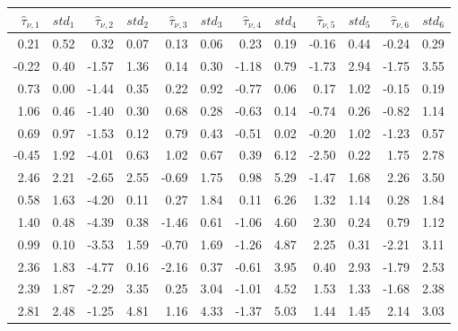 \documentclass{article}
\begin{document}
\begin{tabular}{rrrrrrrrrrrr}\hline 
	$\widehat{\tau}_{\nu,1}$ & $std_1$ & $\widehat{\tau}_{\nu,2}$ & $std_2$ & $\widehat{\tau}_{\nu,3}$ & $std_3$ & $\widehat{\tau}_{\nu,4}$ & $std_4$ &  $\widehat{\tau}_{\nu,5}$ & $std_5$ & $\widehat{\tau}_{\nu,6}$ & $std_6$ \\ \hline 
	0.21 &     0.52 &     0.32 &     0.07  &     0.13 &     0.06 &     0.23 &     0.19 &    -0.16 &     0.44  &    -0.24 &     0.29  \\ 
	-0.22 &     0.40 &    -1.57 &     1.36  &     0.14 &     0.30 &    -1.18 &     0.79 &    -1.73 &     2.94  &    -1.75 &     3.55  \\ 
	0.73 &     0.00 &    -1.44 &     0.35  &     0.22 &     0.92 &    -0.77 &     0.06 &     0.17 &     1.02  &    -0.15 &     0.19  \\ 
	1.06 &     0.46 &    -1.40 &     0.30  &     0.68 &     0.28 &    -0.63 &     0.14 &    -0.74 &     0.26  &    -0.82 &     1.14  \\ 
	0.69 &     0.97 &    -1.53 &     0.12  &     0.79 &     0.43 &    -0.51 &     0.02 &    -0.20 &     1.02  &    -1.23 &     0.57  \\ 
	-0.45 &     1.92 &    -4.01 &     0.63  &     1.02 &     0.67 &     0.39 &     6.12 &    -2.50 &     0.22  &     1.75 &     2.78  \\ 
	2.46 &     2.21 &    -2.65 &     2.55  &    -0.69 &     1.75 &     0.98 &     5.29 &    -1.47 &     1.68  &     2.26 &     3.50  \\ 
	0.58 &     1.63 &    -4.20 &     0.11  &     0.27 &     1.84 &     0.11 &     6.26 &     1.32 &     1.14  &     0.28 &     1.84  \\ 
	1.40 &     0.48 &    -4.39 &     0.38  &    -1.46 &     0.61 &    -1.06 &     4.60 &     2.30 &     0.24  &     0.79 &     1.12  \\ 
	0.99 &     0.10 &    -3.53 &     1.59  &    -0.70 &     1.69 &    -1.26 &     4.87 &     2.25 &     0.31  &    -2.21 &     3.11  \\ 
	2.36 &     1.83 &    -4.77 &     0.16  &    -2.16 &     0.37 &    -0.61 &     3.95 &     0.40 &     2.93  &    -1.79 &     2.53  \\ 
	2.39 &     1.87 &    -2.29 &     3.35  &     0.25 &     3.04 &    -1.01 &     4.52 &     1.53 &     1.33  &    -1.68 &     2.38  \\ 
	2.81 &     2.48 &    -1.25 &     4.81  &     1.16 &     4.33 &    -1.37 &     5.03 &     1.44 &     1.45  &     2.14 &     3.03  \\ 

\end{tabular}
\end{document}
